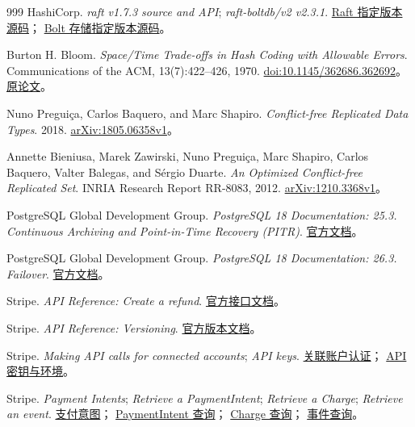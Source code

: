 \begin{thebibliography}{999}
HashiCorp.
\textit{raft v1.7.3 source and API}; \textit{raft-boltdb/v2 v2.3.1}.
\href{https://github.com/hashicorp/raft/tree/v1.7.3}{Raft 指定版本源码}；
\href{https://github.com/hashicorp/raft-boltdb/tree/v2.3.1}{Bolt 存储指定版本源码}。

Burton H. Bloom.
\textit{Space/Time Trade-offs in Hash Coding with Allowable Errors}.
Communications of the ACM, 13(7):422--426, 1970.
\href{https://doi.org/10.1145/362686.362692}{doi:10.1145/362686.362692}。
\href{https://www.cs.princeton.edu/courses/archive/spring05/cos598E/bib/p422-bloom.pdf}{原论文}。

Nuno Preguiça, Carlos Baquero, and Marc Shapiro.
\textit{Conflict-free Replicated Data Types}.
2018. \href{https://arxiv.org/abs/1805.06358}{arXiv:1805.06358v1}。

Annette Bieniusa, Marek Zawirski, Nuno Preguiça, Marc Shapiro,
Carlos Baquero, Valter Balegas, and Sérgio Duarte.
\textit{An Optimized Conflict-free Replicated Set}.
INRIA Research Report RR-8083, 2012.
\href{https://arxiv.org/abs/1210.3368}{arXiv:1210.3368v1}。

PostgreSQL Global Development Group.
\textit{PostgreSQL 18 Documentation: 25.3. Continuous Archiving and Point-in-Time Recovery (PITR)}.
\href{https://www.postgresql.org/docs/18/continuous-archiving.html}{官方文档}。

PostgreSQL Global Development Group.
\textit{PostgreSQL 18 Documentation: 26.3. Failover}.
\href{https://www.postgresql.org/docs/18/warm-standby-failover.html}{官方文档}。

Stripe.
\textit{API Reference: Create a refund}.
\href{https://docs.stripe.com/api/refunds/create}{官方接口文档}。

Stripe.
\textit{API Reference: Versioning}.
\href{https://docs.stripe.com/api/versioning}{官方版本文档}。

Stripe.
\textit{Making API calls for connected accounts}; \textit{API keys}.
\href{https://docs.stripe.com/connect/authentication}{关联账户认证}；
\href{https://docs.stripe.com/keys}{API 密钥与环境}。

Stripe.
\textit{Payment Intents}; \textit{Retrieve a PaymentIntent};
\textit{Retrieve a Charge}; \textit{Retrieve an event}.
\href{https://docs.stripe.com/payments/payment-intents}{支付意图}；
\href{https://docs.stripe.com/api/payment_intents/retrieve}{PaymentIntent 查询}；
\href{https://docs.stripe.com/api/charges/retrieve}{Charge 查询}；
\href{https://docs.stripe.com/api/events/retrieve}{事件查询}。


\end{thebibliography}
